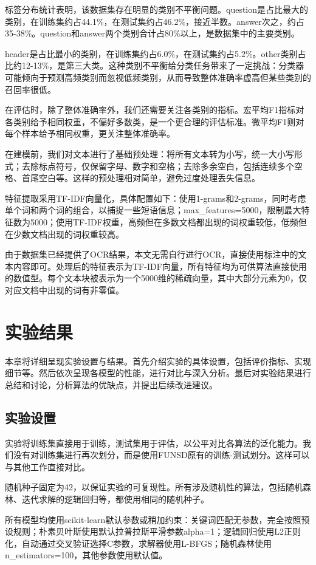\documentclass[12pt,a4paper]{article}
\begin{document}
标签分布统计表明，该数据集存在明显的类别不平衡问题。question是占比最大的类别，在训练集约占44.1\%，在测试集约占46.2\%，接近半数。answer次之，约占35-38\%。question和answer两个类别合计占80\%以上，是数据集中的主要类别。

header是占比最小的类别，在训练集约占6.0\%，在测试集约占5.2\%。other类别占比约12-13\%，是第三大类。这种类别不平衡给分类任务带来了一定挑战：分类器可能倾向于预测高频类别而忽视低频类别，从而导致整体准确率虚高但某些类别的召回率很低。

在评估时，除了整体准确率外，我们还需要关注各类别的指标。宏平均F1指标对各类别给予相同权重，不偏好多数类，是一个更合理的评估标准。微平均F1则对每个样本给予相同权重，更关注整体准确率。

在建模前，我们对文本进行了基础预处理：将所有文本转为小写，统一大小写形式；去除标点符号，仅保留字母、数字和空格；去除多余空白，包括连续多个空格、首尾空白等。这样的预处理相对简单，避免过度处理丢失信息。

特征提取采用TF-IDF向量化，具体配置如下：使用1-grams和2-grams，同时考虑单个词和两个词的组合，以捕捉一些短语信息；max\_features=5000，限制最大特征数为5000；使用TF-IDF权重，高频但在多数文档都出现的词权重较低，低频但在少数文档出现的词权重较高。

由于数据集已经提供了OCR结果，本文无需自行进行OCR，直接使用标注中的文本内容即可。处理后的特征表示为TF-IDF向量，所有特征均为可供算法直接使用的数值型。每个文本块被表示为一个5000维的稀疏向量，其中大部分元素为0，仅对应文档中出现的词有非零值。

\section{实验结果}

本章将详细呈现实验设置与结果。首先介绍实验的具体设置，包括评价指标、实现细节等。然后依次呈现各模型的性能，进行对比与深入分析。最后对实验结果进行总结和讨论，分析算法的优缺点，并提出后续改进建议。

\subsection{实验设置}

实验将训练集直接用于训练，测试集用于评估，以公平对比各算法的泛化能力。我们没有对训练集进行再次划分，而是使用FUNSD原有的训练-测试划分。这样可以与其他工作直接对比。

随机种子固定为42，以保证实验的可复现性。所有涉及随机性的算法，包括随机森林、迭代求解的逻辑回归等，都使用相同的随机种子。

所有模型均使用scikit-learn默认参数或稍加约束：关键词匹配无参数，完全按照预设规则；朴素贝叶斯使用默认拉普拉斯平滑参数alpha=1；逻辑回归使用L2正则化，自动通过交叉验证选择C参数，求解器使用L-BFGS；随机森林使用n\_estimators=100，其他参数使用默认值。
\end{document}
